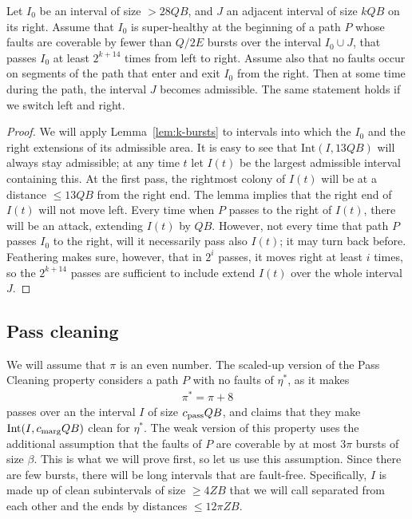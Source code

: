 \documentclass[11pt]{memoir}
\theoremstyle{definition} %
\renewcommand{\le}{\leq}
\renewcommand{\ge}{\geq}
\def\B{B}
\newcommand{\E}{E} %
\newcommand{\Int}{\mathrm{Int}} %
\newcommand{\passno}{\pi}
\newcommand{\Q}{Q} %
\newcommand{\Z}{Z} %
\newcommand{\cns}[1]{c_{\textrm{\upshape #1}}}
\newcommand{\CMarg}{\cns{marg}}
\newcommand{\CPass}{\cns{pass}}
\begin{document}
\begin{lemma}\label{lem:weak-repeated-attack}
  Let \( I_{0} \) be an interval of size \( > 28\Q\B \), and \( J \) an adjacent
  interval of size \( k\Q\B \) on its right.
  Assume that \( I_{0} \) is super-healthy at the beginning of a path \( P \) whose
  faults are coverable by fewer
  than \( \Q/2\E \) bursts over the interval  \( I_{0}\cup J \), that passes \( I_{0} \)
  at least \( 2^{k+14} \) times from left to right.
  Assume also that no faults occur on segments of the path that enter and exit \( I_{0} \) from the right.
  Then at some time during the path, the interval \( J \) becomes admissible.
  The same statement holds if we switch left and right.
\end{lemma}
\begin{proof}
  We will apply Lemma~\ref{lem:k-bursts} to intervals into which the \( I_{0} \) and the
  right extensions of its admissible area.
  It is easy to see that \( \Int(I,13\Q\B) \) will always stay admissible; at any time \( t \)
  let \( I(t) \) be the largest admissible interval containing this.
  At the first pass, the rightmost colony of \( I(t) \) will be at a distance \( \le 13\Q\B \) from the right end.
  The lemma implies that the right end of \( I(t) \) will not move left.
  Every time when \( P \) passes to the right of \( I(t) \), there will be an attack, extending \( I(t) \) by \( \Q\B \).
  However, not every time that path \( P \) passes \( I_{0} \) to the right, will it necessarily pass
  also \( I(t) \); it may turn back before.
  Feathering makes sure, however, that in \( 2^{i} \) passes, it moves right at least \( i \) times,
  so the \( 2^{k+14} \) passes are sufficient to include extend \( I(t) \) over the whole interval \( J \).
  \end{proof}


\subsection{Pass cleaning}\label{sec:pass-cleaning}

\begin{sloppypar}
  We will assume that \( \passno \) is an even number.
The scaled-up version of the Pass Cleaning property
considers a path \( P \) with no faults of \( \eta^{*} \), as it makes
\begin{align}\label{eq:passno}
 \passno^{*}=\passno + 8
 \end{align}
 passes over an the interval \( I \) of size \( \CPass\Q\B \),
 and claims that they make \( \Int(I,\CMarg\Q\B) \) clean for \( \eta^{*} \).
 The weak version of this property uses the additional assumption that the faults of \( P \)
 are coverable by at most \( 3\passno \) bursts of size \( \beta \).
 This is what we will prove first, so let us use this assumption.
 Since there are few bursts, there will be long intervals that are fault-free.
 Specifically, \( I \) is made up of clean subintervals of size \( \ge 4\Z\B \) that we will call 
 separated from each other and the ends by distances \( \le 12\passno\Z\B \).
 \end{sloppypar}
 
\end{document}
